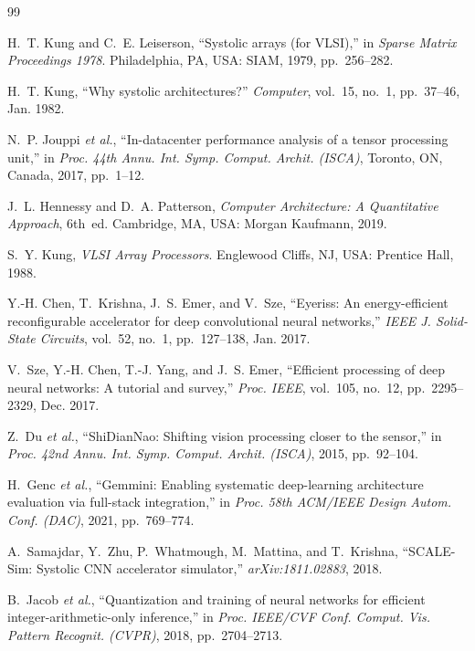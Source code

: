 \documentclass[conference]{IEEEtran}
\begin{document}
\begin{thebibliography}{99}

H.~T. Kung and C.~E. Leiserson, ``Systolic arrays (for VLSI),'' in
\emph{Sparse Matrix Proceedings 1978}. Philadelphia, PA, USA: SIAM, 1979,
pp.~256--282.

H.~T. Kung, ``Why systolic architectures?'' \emph{Computer}, vol.~15, no.~1,
pp.~37--46, Jan. 1982.

N.~P. Jouppi \emph{et al.}, ``In-datacenter performance analysis of a tensor
processing unit,'' in \emph{Proc. 44th Annu. Int. Symp. Comput. Archit.
(ISCA)}, Toronto, ON, Canada, 2017, pp.~1--12.

J.~L. Hennessy and D.~A. Patterson, \emph{Computer Architecture: A
Quantitative Approach}, 6th~ed. Cambridge, MA, USA: Morgan Kaufmann, 2019.

S.~Y. Kung, \emph{VLSI Array Processors}. Englewood Cliffs, NJ, USA:
Prentice Hall, 1988.

Y.-H. Chen, T.~Krishna, J.~S. Emer, and V.~Sze, ``Eyeriss: An
energy-efficient reconfigurable accelerator for deep convolutional neural
networks,'' \emph{IEEE J. Solid-State Circuits}, vol.~52, no.~1,
pp.~127--138, Jan. 2017.

V.~Sze, Y.-H. Chen, T.-J. Yang, and J.~S. Emer, ``Efficient processing of deep
neural networks: A tutorial and survey,'' \emph{Proc. IEEE}, vol.~105,
no.~12, pp.~2295--2329, Dec. 2017.

Z.~Du \emph{et al.}, ``ShiDianNao: Shifting vision processing closer to the
sensor,'' in \emph{Proc. 42nd Annu. Int. Symp. Comput. Archit. (ISCA)},
2015, pp.~92--104.

H.~Genc \emph{et al.}, ``Gemmini: Enabling systematic deep-learning
architecture evaluation via full-stack integration,'' in \emph{Proc. 58th
ACM/IEEE Design Autom. Conf. (DAC)}, 2021, pp.~769--774.

A.~Samajdar, Y.~Zhu, P.~Whatmough, M.~Mattina, and T.~Krishna, ``SCALE-Sim:
Systolic CNN accelerator simulator,'' \emph{arXiv:1811.02883}, 2018.

B.~Jacob \emph{et al.}, ``Quantization and training of neural networks for
efficient integer-arithmetic-only inference,'' in \emph{Proc. IEEE/CVF Conf.
Comput. Vis. Pattern Recognit. (CVPR)}, 2018, pp.~2704--2713.


\end{thebibliography}
\end{document}
